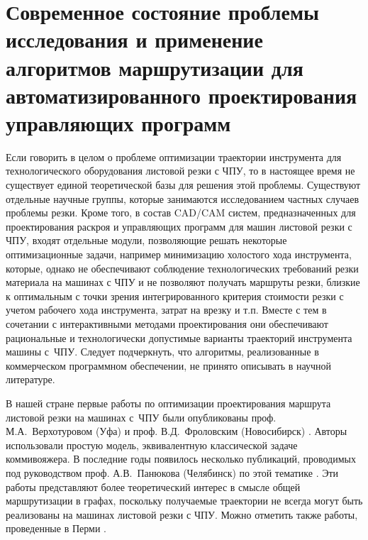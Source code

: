 
\section{Современное состояние проблемы исследования
и применение алгоритмов маршрутизации для автоматизированного
проектирования управляющих программ}
\label{sec:cut.refs}

Если говорить в целом о проблеме оптимизации траектории инструмента для технологического оборудования листовой
резки с ЧПУ,
то в настоящее время не существует единой теоретической базы для решения этой проблемы.
Существуют отдельные научные группы,
которые занимаются исследованием частных случаев проблемы резки.
Кроме того,
в состав CAD/CAM систем,
предназначенных для проектирования раскроя и управляющих программ для машин листовой резки с ЧПУ,
входят отдельные модули,
позволяющие решать некоторые оптимизационные задачи,
например минимизацию холостого хода инструмента,
которые, однако не обеспечивают соблюдение
технологических требований резки материала на машинах с ЧПУ
и не позволяют получать маршруты резки,
близкие к оптимальным с точки зрения интегрированного критерия стоимости резки
с учетом рабочего хода инструмента, затрат на врезку и т.п.
Вместе с тем в сочетании с интерактивными методами проектирования
они обеспечивают рациональные и технологически допустимые варианты траекторий инструмента машины с~ЧПУ.
Следует подчеркнуть, что алгоритмы,
реализованные в коммерческом программном обеспечении,
не принято описывать в научной литературе.

В нашей стране первые работы по оптимизации проектирования маршрута листовой резки на машинах с~ЧПУ
были опубликованы проф. М.А.~Верхотуровом
(Уфа)
\cite{bi:верхотуров2008,bi:верхотуров2008цепь,bi:верхотуров2020}
и проф. В.Д.~Фроловским
(Новосибирск)
\cite{bi:Ganelina,bi:пушкарева,bi:фроловский2005}.
Авторы использовали
простую модель, эквивалентную классической задаче коммивояжера.
В последние годы появилось несколько публикаций,
проводимых под руководством проф. А.В.~Панюкова
(Челябинск) по
этой тематике
\cite{bi:Makarovskikh2019Jan,Makarovskikh20181171,bi:Makarovskikh2019Other}.
Эти работы представляют более теоретический интерес
в смысле общей маршрутизации в графах,
поскольку получаемые траектории не всегда могут быть
реализованы на машинах листовой резки с ЧПУ.
Можно отметить также работы, проведенные в Перми
\cite{bi:мурзакаев2015построение,bi:мурзакаев2015применение,bi:файзрахманов2015,bi:бурылов2016}.

